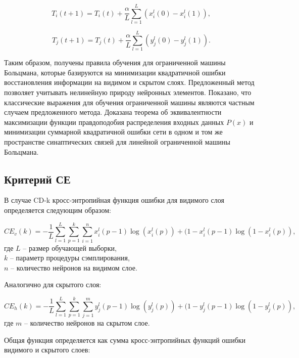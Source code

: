 \begin{equation*}
    T_{i}(t+1)=T_{i}(t)+\frac{\alpha}{L}\sum_{l=1}^L (x_i^l(0)-x_i^l(1)),
\end{equation*}

\begin{equation*}
    T_{j}(t+1)=T_{j}(t)+\frac{\alpha}{L}\sum_{l=1}^L (y_j^l(0)-y_j^l(1)).
\end{equation*}

Таким образом, получены правила обучения для ограниченной машины Больцмана, которые базируются на минимизации квадратичной ошибки восстановления информации на видимом и скрытом слоях.  Предложенный метод позволяет учитывать нелинейную природу нейронных элементов. Показано, что классические выражения для обучения ограниченной машины являются частным случаем предложенного метода. Доказана теорема об эквивалентности максимизации функции правдоподобия распределения входных данных $P(x)$ и минимизации суммарной квадратичной ошибки сети в одном и том же пространстве синаптических связей для линейной ограниченной машины Больцмана. 


\subsection{Критерий СЕ}

В случае CD-k кросс-энтропийная функция ошибки для видимого слоя определяется следующим образом:

\begin{equation*}
	CE_v(k) = -\frac{1}{L}\sum_{l=1}^L \sum_{p=1}^k \sum_{i=1}^n x_i^l(p-1)\log(x_i^l(p))+(1-x_i^l(p-1)\log(1-x_i^l(p)),
\end{equation*}
где $L$ -- размер обучающей выборки,\\
$k$ -- параметр процедуры сэмплирования,\\
$n$ -- количество нейронов на видимом слое.

Аналогично для скрытого слоя:

\begin{equation*}
	CE_h(k) = -\frac{1}{L}\sum_{l=1}^L \sum_{p=1}^k \sum_{j=1}^m y_j^l(p-1)\log(y_j^l(p))+(1-y_j^l(p-1)\log(1-y_j^l(p)),
\end{equation*}
где $m$ -- количество нейронов на скрытом слое.

Общая функция определяется как сумма кросс-энтропийных функций ошибки видимого и скрытого слоев:

